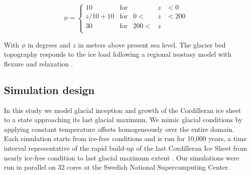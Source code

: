 \begin{equation}
	\phi = \left\{\begin{array}{llrll}
		10      & \mathrm{for} &      &z&<  0 \\
		z/10+10 & \mathrm{for} &   0 <&z&<200 \\
		30      & \mathrm{for} & 200 <&z&     \\
	\end{array}\right.
\end{equation}

With $\phi$ in degrees and $z$ in meters above present sea level. The glacier bed topography responds to the ice load following a regional isostasy model with flexure and relaxation \citep{lingle-clark-1985}.

\subsection{Simulation design}

In this study we model glacial inception and growth of the Cordilleran ice sheet to a state approaching its last glacial maximum. We mimic glacial conditions by applying constant temperature offsets homogeneously over the entire domain. Each simulation starts from ice-free conditions and is run for 10,000 years, a time interval representative of the rapid build-up of the last Cordilleran Ice Sheet from nearly ice-free condition to last glacial maximum extent \citep{clague-1989}. Our simulations were run in parallel on 32 cores at the Swedish National Supercomputing Center.

